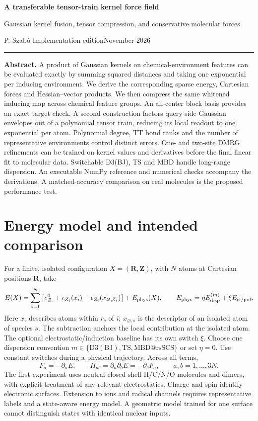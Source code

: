 \documentclass[11pt,a4paper]{article}
\newcommand{\phys}{\mathrm{phys}}\newcommand{\refm}{\mathrm{ref}}
\newcommand{\D}{\partial}\newcommand{\alg}[1]{\par\smallskip{\sffamily\bfseries\color{tealblue}#1}\par\nobreak}
\begin{document}
\thispagestyle{plain}
{\LARGE\sffamily\bfseries\color{ink} A transferable tensor-train kernel force field\par}
{\large\sffamily\color{tealblue} Gaussian kernel fusion, tensor compression, and conservative molecular forces\par}
{\normalsize P. Szab\'o \hfill Implementation edition\quad November 2026\par}
\smallskip\hrule\medskip
\textbf{Abstract.} A product of Gaussian kernels on chemical-environment features can be evaluated exactly by summing squared distances and taking one exponential per inducing environment. We derive the corresponding sparse energy, Cartesian forces and Hessian--vector products. We then compress the same whitened inducing map across chemical feature groups. An all-center block basis provides an exact target check. A second construction factors query-side Gaussian envelopes out of a polynomial tensor train, reducing its local readout to one exponential per atom. Polynomial degree, TT bond ranks and the number of representative environments control distinct errors. One- and two-site DMRG refinements can be trained on kernel values and derivatives before the final linear fit to molecular data. Switchable D3(BJ), TS and MBD handle long-range dispersion. An executable NumPy reference and numerical checks accompany the derivations. A matched-accuracy comparison on real molecules is the proposed performance test.

\section{Energy model and intended comparison}
For a finite, isolated configuration $X=(\mathbf R,\mathbf Z)$, with $N$ atoms at Cartesian positions $\mathbf R$, take
\begin{equation}
 E(X)=\sum_{i=1}^{N}\big[e^0_{Z_i}+\epsilon_{Z_i}(x_i)-\epsilon_{Z_i}(x_{\varnothing,Z_i})\big]
       +E_{\phys}(X),\qquad
 E_{\phys}=\eta E_{\rm disp}^{(m)}+\xi E_{\rm el/pol}.
 \label{eq:model}
\end{equation}
Here $x_i$ describes atoms within $r_c$ of $i$; $x_{\varnothing,s}$ is the descriptor of an isolated atom of species $s$. The subtraction anchors the local contribution at the isolated atom. The optional electrostatic/induction baseline has its own switch $\xi$. Choose one dispersion convention $m\in\{\mathrm{D3(BJ)},\mathrm{TS},\mathrm{MBD@rsSCS}\}$ or set $\eta=0$. Use constant switches during a physical trajectory. Across all terms,
\[
 F_a=-\D_a E,\qquad H_{ab}=\D_a\D_b E=-\D_bF_a,\qquad a,b=1,\ldots,3N .
\]
The first experiment uses neutral closed-shell H/C/N/O molecules and dimers, with explicit treatment of any relevant electrostatics. Charge and spin identify electronic surfaces. Extension to ions and radical channels requires representative labels and a state-aware energy model. A geometric model trained for one surface cannot distinguish states with identical nuclear inputs.
\end{document}
